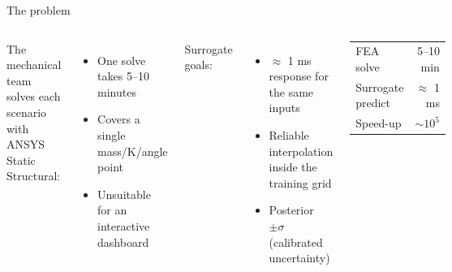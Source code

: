 \begin{frame}{The problem}
  \begin{columns}[T,onlytextwidth]
    The mechanical team solves each scenario with ANSYS Static Structural:
    \begin{itemize}\small
      \item One solve takes 5--10 minutes
      \item Covers a single mass/K/angle point
      \item \alert{Unsuitable} for an interactive dashboard
    \end{itemize}
    \vspace{0.4cm}
    Surrogate goals:
    \begin{itemize}\small
      \item \(\approx\) 1 ms response for the same inputs
      \item \alert{Reliable interpolation} inside the training grid
      \item Posterior \(\pm\sigma\) (calibrated uncertainty)
    \end{itemize}
    \begin{center}
      \footnotesize
      \begin{tabular}{lr}
        \toprule
        FEA solve & 5--10 min \\
        Surrogate predict & \(\approx\) 1 ms \\
        Speed-up & \(\sim 10^5\) \\
        \bottomrule
      \end{tabular}
    \end{center}
  \end{columns}
\end{frame}

